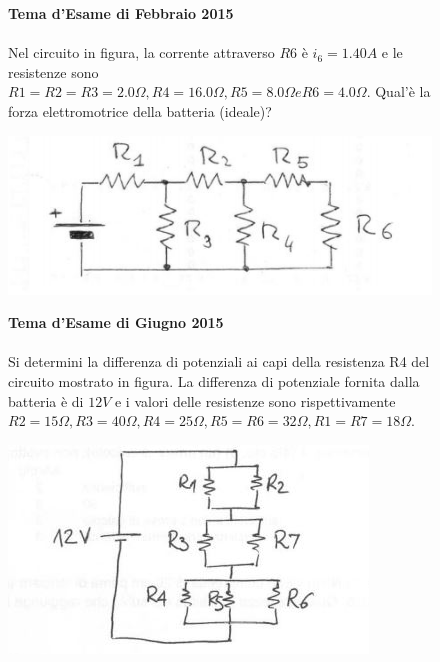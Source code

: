 \begin{figure}[h!]
\textbf{Tema d'Esame di Febbraio 2015}\\ \\
 Nel circuito in figura, la corrente attraverso $R6$ è $i_6=1.40A$ e le resistenze sono
$R1=R2=R3=2.0\Omega, R4= 16.0\Omega, R5= 8.0 \Omega e R6= 4.0 \Omega$. Qual'è la forza elettromotrice della batteria (ideale)?
\begin{center}
		\includegraphics[scale=0.8]{ES5/FEB052015.jpg}
	\end{center}
\end{figure}

\begin{figure}[h!]
\textbf{Tema d'Esame di Giugno 2015}\\ \\
Si determini la differenza di potenziali ai capi della resistenza R4 del circuito mostrato in figura. La differenza di potenziale fornita dalla batteria è di $12V$ e i valori delle resistenze sono rispettivamente $R2=15\Omega, R3=40\Omega, R4=25\Omega, R5=R6=32\Omega, R1=R7=18\Omega$.
\begin{center}
		\includegraphics[scale=1]{ES5/GIU052015.jpg}
	\end{center}
\end{figure}

